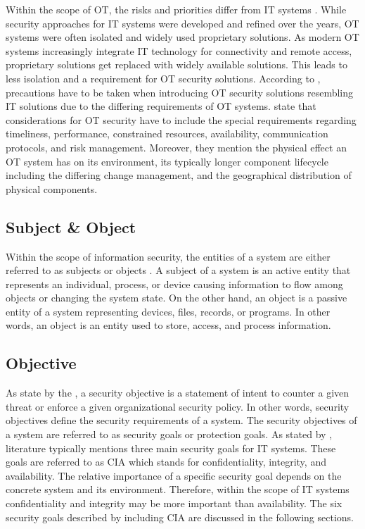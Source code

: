 Within the scope of OT, the risks and priorities differ from IT systems \cite{Stouffer2023}.
While security approaches for IT systems were developed and refined over the years, OT systems were often isolated and widely used proprietary solutions.
As modern OT systems increasingly integrate IT technology for connectivity and remote access, proprietary solutions get replaced with widely available solutions.
This leads to less isolation and a requirement for OT security solutions.
According to \citeauthor{Stouffer2023} \cite{Stouffer2023}, precautions have to be taken when introducing OT security solutions resembling IT solutions due to the differing requirements of OT systems.
\citeauthor{Stouffer2023} state that considerations for OT security have to include the special requirements regarding timeliness, performance, constrained resources, availability, communication protocols, and risk management.
Moreover, they mention the physical effect an OT system has on its environment, its typically longer component lifecycle including the differing change management, and the geographical distribution of physical components.

\subsection{Subject \& Object}
Within the scope of information security, the entities of a system are either referred to as subjects or objects \cite{JTF2020}.
A subject of a system is an active entity that represents an individual, process, or device causing information to flow among objects or changing the system state. 
On the other hand, an object is a passive entity of a system representing devices, files, records, or programs.
In other words, an object is an entity used to store, access, and process information.

\subsection{Objective}
As state by the \citeauthor{nsa2009} \cite{nsa2009}, a security objective is a statement of intent to counter a given threat or enforce a given organizational security policy.
In other words, security objectives define the security requirements of a system.
The security objectives of a system are referred to as security goals or protection goals.
As stated by \citeauthor{Eckert2023} \cite{Eckert2023}, literature typically mentions three main security goals for IT systems.
These goals are referred to as CIA which stands for confidentiality, integrity, and availability.
The relative importance of a specific security goal depends on the concrete system and its environment.
Therefore, within the scope of IT systems confidentiality and integrity may be more important than availability.
The six security goals described by \citeauthor{Eckert2023} including CIA are discussed in the following sections.

